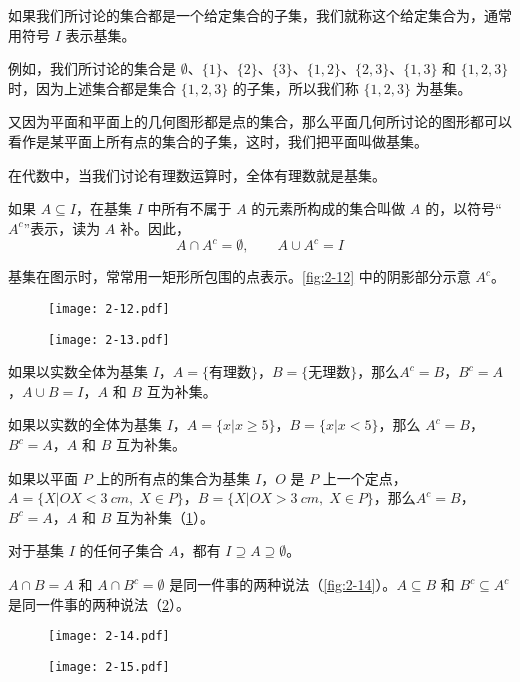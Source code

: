 如果我们所讨论的集合都是一个给定集合的子集，我们就称这个给定集合为，通常用符号 $I$ 表示基集。

例如，我们所讨论的集合是 $\emptyset$、$\{1\}$、$\{2\}$、$\{3\}$、$\{1, 2\}$、$\{2, 3\}$、$\{1, 3\}$ 和 $\{1, 2, 3\}$时，因为上述集合都是集合 $\{1, 2, 3\}$ 的子集，所以我们称 $\{1, 2, 3\}$ 为基集。

又因为平面和平面上的几何图形都是点的集合，那么平面几何所讨论的图形都可以看作是某平面上所有点的集合的子集，这时，我们把平面叫做基集。

在代数中，当我们讨论有理数运算时，全体有理数就是基集。

如果 $A\subseteq I$，在基集 $I$ 中所有不属于 $A$ 的元素所构成的集合叫做 $A$ 的，以符号“$A^c$”表示，读为 $A$ 补。因此，
\[A\cap A^c=\emptyset,\qquad A\cup A^c=I\]

基集在图示时，常常用一矩形所包围的点表示。\cref{fig:2-12} 中的阴影部分示意 $A^c$。

\begin{figure}
	\begin{minipage}[b]{0.48\linewidth}
		\centering
		\texttt{[image: 2-12.pdf]}
		\caption{}\label{fig:2-12}
	\end{minipage}
	\begin{minipage}[b]{0.48\linewidth}
		\centering
		\texttt{[image: 2-13.pdf]}
		\caption{}\label{fig:2-13}
	\end{minipage}
\end{figure}

如果以实数全体为基集 $I$，$A=\{\text{有理数}\}$，$B=\{\text{无理数}\}$，那么$A^c=B$，$B^c=A$，$A\cup B=I$，$A$ 和 $B$ 互为补集。

如果以实数的全体为基集 $I$，$A=\{x|x\ge 5\}$，$B=\{x|x<5\}$，那么 $A^c=B$，$B^c=A$，$A$ 和 $B$ 互为补集。

如果以平面 $P$ 上的所有点的集合为基集 $I$，$O$ 是 $P$ 上一个定点，$A=\{X|OX<\qty{3}{cm},\; X\in P\}$，$B=\{X|OX>\qty{3}{cm},\; X\in P\}$，那么$A^c=B$，$B^c=A$，$A$ 和 $B$ 互为补集（\cref{fig:2-13}）。

对于基集 $I$ 的任何子集合 $A$，都有 $I\supseteq A\supseteq \emptyset$。

$A\cap B=A$ 和 $A\cap B^c=\emptyset$ 是同一件事的两种说法（\cref{fig:2-14}）。$A\subseteq B$ 和 $B^c\subseteq A^c$ 是同一件事的两种说法（\cref{fig:2-15}）。

\begin{figure}
	\begin{minipage}[b]{0.48\linewidth}
		\centering
		\texttt{[image: 2-14.pdf]}
		\caption{}\label{fig:2-14}
	\end{minipage}
	\begin{minipage}[b]{0.48\linewidth}
		\centering
		\texttt{[image: 2-15.pdf]}
		\caption{}\label{fig:2-15}
	\end{minipage}
\end{figure}

